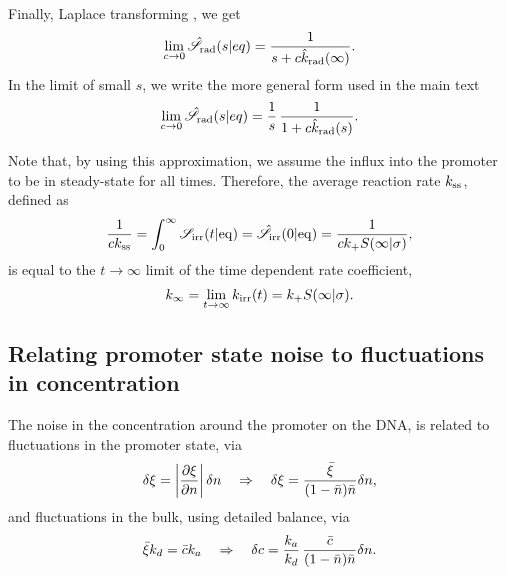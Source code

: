 Finally, Laplace transforming , we get
\begin{equation}
 \lim_{c \to 0} \hat{\mathscr{S}}_{\rm rad}(s|eq) = \frac{1}{s + c \hat{k}_{\rm rad}(\infty)}.
\end{equation}
In the limit of small $s$, we write the more general form used in the main text
\begin{equation}
 \lim_{c \to 0} \hat{\mathscr{S}}_{\rm rad}(s|eq) = \frac{1}{s} \, \frac{1}{1 + c \hat{k}_{\rm rad}(s)}.
\end{equation}

Note that, by using this approximation, we assume the influx into the promoter to be in steady-state for all times. Therefore, the average reaction rate $k_{\rm ss}$, defined as
\begin{equation}
 \frac{1}{c k_{\rm ss}} = \int_0^\infty \mathscr{S}_{\rm irr}(t|{\rm eq}) = \hat{\mathscr{S}}_{\rm irr}(0|{\rm eq}) = \frac{1}{c k_+ S(\infty|\sigma)},
\end{equation}
is equal to the $t\to\infty$ limit of the time dependent rate coefficient, 
\begin{equation}
 k_{\infty} = \lim_{t \to \infty} k_{{\rm irr}}(t) = k_+ S(\infty|\sigma).
\end{equation}


\subsection{ Relating promoter state noise to fluctuations in concentration}
The noise in the concentration around the promoter on the DNA, is related to fluctuations in the promoter state, via 
\begin{equation}
 \delta \xi = \left|\frac{\partial \xi}{\partial n}\right| \delta n \quad \Rightarrow \quad  \delta \xi = \frac{\bar{\xi}}{(1-\bar{n})\bar{n}}\delta n,
 \elabel{EqxiNoise}
\end{equation}
and fluctuations in the bulk, using detailed balance, via
\begin{equation}
 \bar{\xi} k_d = \bar{c} k_a \quad \Rightarrow \quad \delta c = \frac{k_a}{k_d} \, \frac{\bar{c}}{(1-\bar{n})\bar{n}}\delta n.
 \elabel{EqcNoise}
\end{equation}


